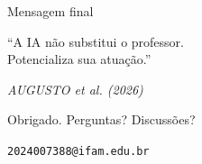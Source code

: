 \documentclass[11pt]{beamer}
\newcommand{\citabnt}[1]{%
	\vfill
	\begin{flushright}
		\tiny\textit{#1}
	\end{flushright}
}
\begin{document}
	\begin{frame}{Mensagem final}
		\begin{center}
			\Large
			``A IA não substitui o professor.\\
			\vspace{0.5em}
			Potencializa sua atuação.''
		\end{center}
		\citabnt{AUGUSTO et al. (2026)}
	\end{frame}
	
	\begin{frame}{}
		\begin{center}
			\Huge Obrigado.
			\vspace{1em}
			\normalsize
			Perguntas? Discussões?
			\vspace{2em}
			
			\texttt{2024007388@ifam.edu.br}
		\end{center}
	\end{frame}
	
\end{document}

